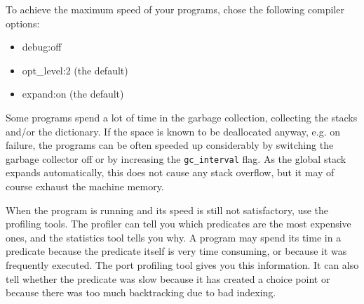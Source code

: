 To achieve the maximum speed of your programs, chose the following compiler
options:
\begin{itemize}
\item debug:off
\item opt_level:2 (the default)
\item expand:on (the default)
\end{itemize}
Some programs spend a lot of time in the garbage collection,
collecting the stacks and/or the dictionary.
If the space is known to be deallocated anyway, e.g. on failure,
the programs can be often speeded up considerably
by switching the garbage collector off or by increasing
the {\tt gc_interval} flag.
As the global stack expands automatically, this does not cause
any stack overflow, but it may of course exhaust the machine memory.

When the program is running and its speed is still
not satisfactory, use the profiling tools.
The profiler can tell you which predicates
are the most expensive ones, and the statistics tool
tells you why.
A program may spend its time in a predicate because the predicate
itself is very time consuming, or because it was frequently executed.
The port profiling tool gives you this information.
It can also tell whether the predicate was slow because it
has created a choice point or because there was too much
backtracking due to bad indexing.

